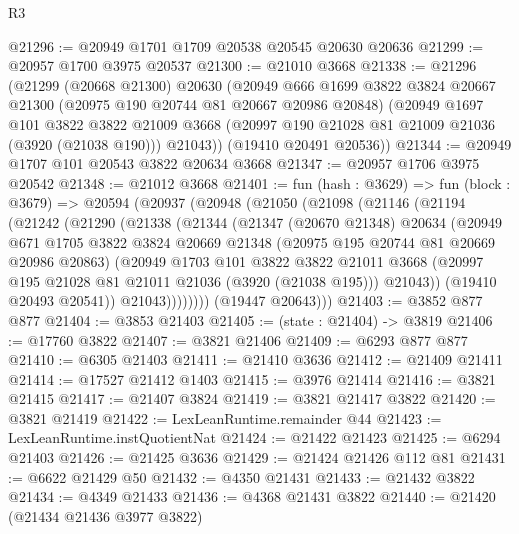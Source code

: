 \begin{lexlean}{R3}
\begin{coremodule}
@21296 := @20949 @1701 @1709 @20538 @20545 @20630 @20636
@21299 := @20957 @1700 @3975 @20537
@21300 := @21010 @3668
@21338 := @21296
    (@21299
      (@20668 @21300)
      @20630
      (@20949
        @666
        @1699
        @3822
        @3824
        @20667
        @21300
        (@20975 @190 @20744 @81 @20667 @20986 @20848)
        (@20949
          @1697
          @101
          @3822
          @3822
          @21009
          @3668
          (@20997 @190 @21028 @81 @21009 @21036 (@3920 (@21038 @190)))
          @21043))
      (@19410 @20491 @20536))
@21344 := @20949 @1707 @101 @20543 @3822 @20634 @3668
@21347 := @20957 @1706 @3975 @20542
@21348 := @21012 @3668
@21401 := fun (hash : @3629) =>
  fun (block : @3679) =>
  @20594
    (@20937
      (@20948
        (@21050
          (@21098
            (@21146
              (@21194
                (@21242
                  (@21290
                    (@21338
                      (@21344
                        (@21347
                          (@20670 @21348)
                          @20634
                          (@20949
                            @671
                            @1705
                            @3822
                            @3824
                            @20669
                            @21348
                            (@20975 @195 @20744 @81 @20669 @20986 @20863)
                            (@20949
                              @1703
                              @101
                              @3822
                              @3822
                              @21011
                              @3668
                              (@20997 @195 @21028 @81 @21011 @21036 (@3920 (@21038 @195)))
                              @21043))
                          (@19410 @20493 @20541))
                        @21043))))))))
        (@19447 @20643)))
@21403 := @3852 @877 @877
@21404 := @3853 @21403
@21405 := (state : @21404) -> @3819
@21406 := @17760 @3822
@21407 := @3821 @21406
@21409 := @6293 @877 @877
@21410 := @6305 @21403
@21411 := @21410 @3636
@21412 := @21409 @21411
@21414 := @17527 @21412 @1403
@21415 := @3976 @21414
@21416 := @3821 @21415
@21417 := @21407 @3824
@21419 := @3821 @21417 @3822
@21420 := @3821 @21419
@21422 := LexLeanRuntime.remainder @44
@21423 := LexLeanRuntime.instQuotientNat
@21424 := @21422 @21423
@21425 := @6294 @21403
@21426 := @21425 @3636
@21429 := @21424 @21426 @112 @81
@21431 := @6622 @21429 @50
@21432 := @4350 @21431
@21433 := @21432 @3822
@21434 := @4349 @21433
@21436 := @4368 @21431 @3822
@21440 := @21420 (@21434 @21436 @3977 @3822)

\end{coremodule}
\end{lexlean}
